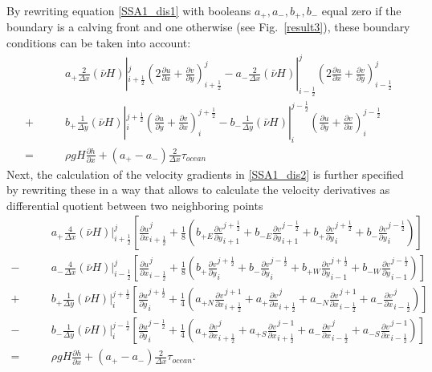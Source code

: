 \documentclass[a4paper,10pt]{article}
\begin{document}
By rewriting equation \eqref{SSA1_dis1} with booleans $a_+, a_-, b_+, b_-$ equal zero if the boundary is a calving front and one otherwise (see Fig.~\ref{result3}), these boundary conditions can be taken into account:
\begin{align}
&\qquad a_+\frac{2}{\Delta x}(\bar{\nu} H)|_{i+\frac{1}{2}}^j\left( 2\frac{\partial u}{\partial x} + \frac{\partial v}{\partial y} \right)_{i+\frac{1}{2}}^j
- a_-\frac{2}{\Delta x}(\bar{\nu} H)|_{i-\frac{1}{2}}^j\left( 2\frac{\partial u}{\partial x} + \frac{\partial v}{\partial y} \right)_{i-\frac{1}{2}}^j \nonumber \\
+ &\qquad b_+\frac{1}{\Delta y}(\bar{\nu} H)|_i^{j+\frac{1}{2}}\left(\frac{\partial u}{\partial y}+\frac{\partial v}{\partial x}\right)_i^{j+\frac{1}{2}} 
- b_-\frac{1}{\Delta y}(\bar{\nu} H)|_i^{j-\frac{1}{2}}\left(\frac{\partial u}{\partial y}+\frac{\partial v}{\partial x}\right)_i^{j-\frac{1}{2}} \nonumber \\
= &\qquad \rho gH \frac{\partial h}{\partial x} + (a_+ - a_-)\frac{2}{\Delta x}\tau_{ocean} \label{SSA1_dis2}
\end{align}
Next, the calculation of the velocity gradients in \eqref{SSA1_dis2} is further specified by rewriting these in a way that allows to calculate the velocity derivatives as differential quotient between two neighboring points
\begin{align}
&\qquad a_+\frac{4}{\Delta x}(\bar{\nu}H)|_{i+\frac{1}{2}}^j\left[\frac{\partial u}{\partial x}_{i+\frac{1}{2}}^j + \frac{1}{8}\left( b_{+E}\frac{\partial v}{\partial y}_{i+1}^{j+\frac{1}{2}}+b_{-E}\frac{\partial v}{\partial y}_{i+1}^{j-\frac{1}{2}}+b_+\frac{\partial v}{\partial y}_{i}^{j+\frac{1}{2}}+b_-\frac{\partial v}{\partial y}_{i}^{j-\frac{1}{2}}  \right) \right] \nonumber \\
- &\qquad a_-\frac{4}{\Delta x}(\bar{\nu}H)|_{i-\frac{1}{2}}^j\left[\frac{\partial u}{\partial x}_{i-\frac{1}{2}}^j + \frac{1}{8}\left( b_+\frac{\partial v}{\partial y}_{i}^{j+\frac{1}{2}} + b_-\frac{\partial v}{\partial y}_{i}^{j-\frac{1}{2}} + b_{+W}\frac{\partial v}{\partial y}_{i-1}^{j+\frac{1}{2}} + b_{-W}\frac{\partial v}{\partial y}_{i-1}^{j-\frac{1}{2}} \right) \right] \nonumber \\
+ &\qquad b_+\frac{1}{\Delta y}(\bar{\nu}H)|_i^{j+\frac{1}{2}}\left[\frac{\partial u}{\partial y}_i^{j+\frac{1}{2}}+\frac{1}{4}\left( a_{+N}\frac{\partial v}{\partial x}_{i+\frac{1}{2}}^{j+1} + a_+\frac{\partial v}{\partial x}_{i+\frac{1}{2}}^{j} + a_{-N}\frac{\partial v}{\partial x}_{i-\frac{1}{2}}^{j+1} + a_-\frac{\partial v}{\partial x}_{i-\frac{1}{2}}^{j} \right) \right] \nonumber \\
- &\qquad b_-\frac{1}{\Delta y} (\bar{\nu}H)|_i^{j-\frac{1}{2}} \left[\frac{\partial u}{\partial y}_i^{j-\frac{1}{2}}+\frac{1}{4}\left( a_+\frac{\partial v}{\partial x}_{i+\frac{1}{2}}^{j} + a_{+S}\frac{\partial v}{\partial x}_{i+\frac{1}{2}}^{j-1} + a_-\frac{\partial v}{\partial x}_{i-\frac{1}{2}}^{j} + a_{-S}\frac{\partial v}{\partial x}_{i-\frac{1}{2}}^{j-1} \right) \right] \nonumber \\
= &\qquad \rho gH \frac{\partial h}{\partial x} + (a_+ - a_-)\frac{2}{\Delta x}\tau_{ocean}. \label{SSA1_dis3}
\end{align}
\end{document}
